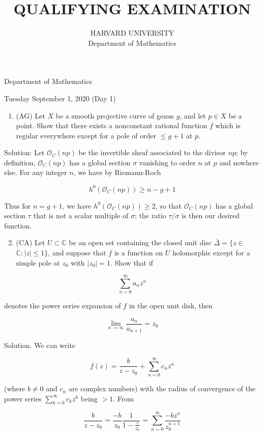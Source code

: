 \documentclass[10pt]{article}
\title{QUALIFYING EXAMINATION }
\author{HARVARD UNIVERSITY\\
Department of Mathematics}
\date{}
\begin{document}
\maketitle
Department of Mathematics

Tuesday September 1, 2020 (Day 1)

\begin{enumerate}
  \item (AG) Let $X$ be a smooth projective curve of genus $g$, and let $p \in X$ be a point. Show that there exists a nonconstant rational function $f$ which is regular everywhere except for a pole of order $\leq g+1$ at $p$.
\end{enumerate}

Solution: Let $\mathcal{O}_{C}(n p)$ be the invertible sheaf associated to the divisor $n p$; by definition, $\mathcal{O}_{C}(n p)$ has a global section $\sigma$ vanishing to order $n$ at $p$ and nowhere else. For any integer $n$, we have by Riemann-Roch

$$
h^{0}\left(\mathcal{O}_{C}(n p)\right) \geq n-g+1
$$

Thus for $n=g+1$, we have $h^{0}\left(\mathcal{O}_{C}(n p)\right) \geq 2$, so that $\mathcal{O}_{C}(n p)$ has a global section $\tau$ that is not a scalar multiple of $\sigma$; the ratio $\tau / \sigma$ is then our desired function.

\begin{enumerate}
  \setcounter{enumi}{1}
  \item (CA) Let $U \subset \mathbb{C}$ be an open set containing the closed unit disc $\bar{\Delta}=\{z \in$ $\mathbb{C}:|z| \leq 1\}$, and suppose that $f$ is a function on $U$ holomorphic except for a simple pole at $z_{0}$ with $\left|z_{0}\right|=1$. Show that if
\end{enumerate}

$$
\sum_{n=0}^{\infty} a_{n} z^{n}
$$

denotes the power series expansion of $f$ in the open unit disk, then

$$
\lim _{n \rightarrow \infty} \frac{a_{n}}{a_{n+1}}=z_{0}
$$

Solution. We can write

$$
f(z)=\frac{b}{z-z_{0}}+\sum_{n=0}^{\infty} c_{n} z^{n}
$$

(where $b \neq 0$ and $c_{n}$ are complex numbers) with the radius of convergence of the power series $\sum_{k=0}^{\infty} c_{k} z^{k}$ being $>1$. From

$$
\frac{b}{z-z_{0}}=\frac{-b}{z_{0}} \frac{1}{1-\frac{z}{z_{0}}}=\sum_{n=0}^{\infty} \frac{-b z^{n}}{z_{0}^{n+1}}
$$
\end{document}
